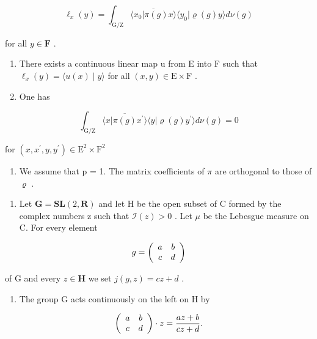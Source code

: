 \[
\ell_ {x} (y) = \int_ {\mathrm{G/Z}} \overline {{\langle x _ {0} | \pi (g) x \rangle}} \langle y _ {0} | \varrho (g) y \rangle d \nu (g)
\]

for all \(y \in \mathbf{F}\) .

\begin{enumerate}
\def\labelenumi{\alph{enumi})}
\setcounter{enumi}{2}
\item
  There exists a continuous linear map u from E into F such that \(\ell_{x}(y)=\langle u(x)\mid y\rangle\) for all \((x,y)\in\mathrm{E}\times\mathrm{F}\) .
\item
  One has
\end{enumerate}

\[
\int_ {\mathrm{G} / \mathrm{Z}} \overline {{\langle x | \pi (g) x ^ {\prime} \rangle}} \langle y | \varrho (g) y ^ {\prime} \rangle d \nu (g) = 0
\]

for \((x,x^{\prime},y,y^{\prime})\in \mathrm{E}^{2}\times \mathrm{F}^{2}\)

\begin{enumerate}
\def\labelenumi{\alph{enumi})}
\setcounter{enumi}{4}
\tightlist
\item
  We assume that p = 1. The matrix coefficients of \(\pi\) are orthogonal to those of \(\varrho\) .
\end{enumerate}

\begin{enumerate}
\def\labelenumi{\arabic{enumi})}
\setcounter{enumi}{15}
\tightlist
\item
  Let \(\mathbf{G} = \mathbf{S}\mathbf{L}(2, \mathbf{R})\) and let H be the open subset of C formed by the complex numbers z such that \(\mathcal{I}(z) > 0\) . Let \(\mu\) be the Lebesgue measure on C. For every element
\end{enumerate}

\[
g = \left( \begin{array}{c c} a & b \\ c & d \end{array} \right)
\]

of G and every \(z \in \mathbf{H}\) we set \(j(g, z) = cz + d\) .

\begin{enumerate}
\def\labelenumi{\alph{enumi})}
\tightlist
\item
  The group G acts continuously on the left on H by
\end{enumerate}

\[
\left( \begin{array}{c c} a & b \\ c & d \end{array} \right) \cdot z = \frac {a z + b}{c z + d}.
\]

